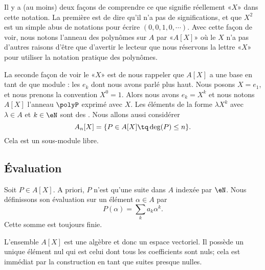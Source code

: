 Il y a (au moins) deux façons de comprendre ce que signifie réellement «\( X\)» dans cette notation. La première est de dire qu'il n'a pas de significations, et que \( X^2\) est un simple abus de notations pour écrire \( (0,0,1,0,\cdots)\). Avec cette façon de voir, nous notons l'anneau des polynômes sur \( A\) par «\( A[X]\)» où le \( X\) n'a pas d'autres raisons d'être que d'avertir le lecteur que nous réservons la lettre «\( X\)» pour utiliser la notation pratique des polynômes.

La seconde façon de voir le «\( X\)» est de nous rappeler que \( A[X]\) a une base en tant de que module : les \( e_k\) dont nous avons parlé plus haut. Nous posons \( X=e_1\), et nous prenons la convention \( X^0=1\). Alors nous avons \( e_k=X^k\) et nous notons \( A[X]\) l'anneau \( \polyP\) exprimé avec \( X\). Les éléments de la forme \( \lambda X^k\) avec \( \lambda\in A\) et \( k\in\eN\) sont des . Nous allons aussi considérer
\begin{equation}
    A_n[X]=\{ P\in A[X]\tq \deg(P)\leq n \}.
\end{equation}
Cela est un sous-module libre.

\subsection{Évaluation}

Soit \( P\in A[X]\). A priori, \( P\) n'est qu'une suite dans \( A\) indexée par \( \eN\). Nous définissons son évaluation sur un élément \( \alpha\in A\) par
\begin{equation}
    P(\alpha)=\sum_ka_k\alpha^k.
\end{equation}
Cette somme est toujours finie.

\begin{normaltext}      \label{NORMooQFTJooLBcPxl}
    L'ensemble \( A[X]\) est une algèbre et donc un espace vectoriel. Il possède un unique élément nul qui est celui dont tous les coefficients sont nuls; cela est immédiat par la construction en tant que suites presque nulles.
\end{normaltext}

